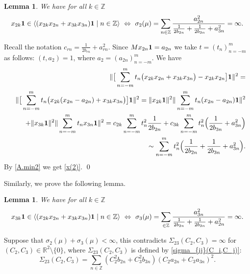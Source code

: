 \documentclass[preprint,12pt]{elsarticle}
\newtheorem{lem}[thm]{Lemma}
\numberwithin{equation}{section}
\begin{document}
\begin{lem}
\label{l.x(2)} 
We have for all $k\in \mathbb Z$
\begin{equation}
 \label{x(2)}  
x_{2k}{\bf 1}\in\langle (x_{2k}x_{2n}+x_{3k}x_{3n}){\bf 1}\mid n\in{\mathbb
Z}\rangle \,\,\Leftrightarrow\,\,
\sigma_{2}(\mu)=\sum_{n\in\mathbb
Z}\frac{a_{2n}^2}{\frac{1}{2b_{2n}}+\frac{1}{2b_{3n}}+a_{3n}^2}=\infty.
\end{equation}
\end{lem}
\begin{pf}
 Recall the notation $c_{rn}=\frac{1}{2b_{rn}}+a_{rn}^2$.
Since $Mx_{2n}{\bf 1}=a_{2n}$  we take $t=(t_n)_{n=-m}^m$ as follows: $(t,a_2)=1$, where $a_2=(a_{2n})_{n=-m}^m.$ 
 We have
\begin{eqnarray*}
 &&\Vert \big[\sum_{n=-m}^mt_n\big(x_{2k}x_{2n}+x_{3k}x_{3n}\big)-x_{2k}x_{2n}\big]{\bf 1}\Vert^2=\\
&&
\Vert \big[\sum_{n=-m}^mt_n\big(x_{2k}(x_{2n}-a_{2n})+x_{3k}x_{3n}\big)\big]{\bf
1}\Vert^2= \Vert x_{2k}{\bf 1}\Vert^2 
 \Vert \sum_{n=-m}^mt_n (x_{2n}-a_{2n}){\bf 1}\Vert^2 \\
 &&
+\Vert x_{3k} {\bf 1}\Vert^2 
   \Vert \sum_{n=-m}^mt_n x_{3n} {\bf 1}\Vert^2=
c_{2k} \sum_{n=-m}^mt^2_n\frac{1}{2b_{2n}}  +
c_{3k} \sum_{n=-m}^mt^2_n\Big(\frac{1}{2b_{3n}}+ a^2_{3n}\Big)\\
&&
 \sim  \sum_{n=-m}^mt^2_n\Big(\frac{1}{2b_{2n}}+\frac{1}{2b_{3n}}+ a^2_{3n}\Big).
\end{eqnarray*}
By \eqref{A.min2} we get \eqref{x(2)}.
\qed\end{pf}
Similarly, we prove the following lemma.
\begin{lem}
\label{l.x(3)}
We have for all $k\in \mathbb Z$
\begin{equation}
 \label{x(3)}  
x_{3k}{\bf 1}\in\langle (x_{2k}x_{2n}+x_{3k}x_{3n}){\bf 1}\mid n\in{\mathbb
Z}\rangle \,\,\Leftrightarrow\,\,
\sigma_{3}(\mu)=\sum_{\in\mathbb
Z}\frac{a_{3n}^2}{\frac{1}{2b_{2n}}+\frac{1}{2b_{3n}}+a_{2n}^2}=\infty.
\end{equation}
\end{lem}
%
\begin{rem}
\label{r.S=(011)x(2)-x(3)} 
Suppose that $\sigma_{2}(\mu)+\sigma_{3}(\mu)<\infty$, this contradicts $\Sigma_{23}(C_2,C_3)=\infty$ for $(C_2,C_3)\in{\mathbb R}^2\setminus\{0\}$, where $\Sigma_{23}(C_2,C_3)$ is defined by 
 \eqref{sigma_{ij}(C_i,C_j)}: 
\begin{equation*}
\Sigma_{23}(C_2,C_3)
=\sum_{n\in {\mathbb Z}}(C^2_2b_{2n}+C^2_3b_{3n})(C_2a_{2n}+C_3a_{3n})^2.
\end{equation*}
\end{rem}
\end{document}
